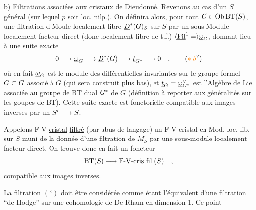 b) \uline{Filtration}s \uline{associées aux cristaux de Dieudonné}. Revenons au cas d'un $S$ général (sur lequel $p$ soit loc. nilp.). On définira alors, pour tout $G\in\mathrm{Ob}\,\mathrm{BT}(S)$, une filtration  d Moule localement libre $\underline{D}^{*}(G)_S$ sur $S$ par un sous-Module localement facteur direct (donc localement libre de t.f.) $\inserted{\handwritten{\underline{\mathrm{Fil}}^1=}}\underline{\handwritten{\omega}}_G$, donnant lieu à une suite exacte
\[
0\handwritten{\longrightarrow}\underline{\handwritten{\omega}}_G\handwritten{\longrightarrow}\underline{D}^{\handwritten{*}}(G)\handwritten{\longrightarrow}\underline{t}_{G^{\handwritten{*}}}\handwritten{\longrightarrow}0\quad,
\tag*{\handwritten{($\unsure{*|\delta}$)}}
\]
où en fait $\underline{\omega}_G$ est le module des différentielles invariantes sur le groupe formel $\bar{G}\subset G$ associé à $G$ (qui sera construit plus bas), et $\underline{t}_G=\underline{\omega}_{G^{*}}^{\vee}$ est l'Algèbre de Lie associée au groupe de BT dual $G^{*}$ de $G$ (définition à reporter aux généralités sur les goupes de BT). Cette  suite exacte est fonctorielle   compatible aux images inverses par un $S'\longrightarrow S$.


Appelons F-V-\uline{cristal} \uline{filtré}  (par abus de langage) un F-V-cristal en Mod. loc. lib. sur $S$ muni de  la donnée d'une filtration de $M_S$ par une sous-module localement facteur direct. On trouve donc en fait un foncteur
\[
\mathrm{BT}(S)\longrightarrow\text{F-V-cris fil }(S)\quad ,
\]
compatible aux images inverses.

 La filtration $(*)$ doit être considérée comme étant l'équivalent d'une filtration ``de Hodge'' sur une cohomologie de De Rham  en dimension 1.  Ce point 

